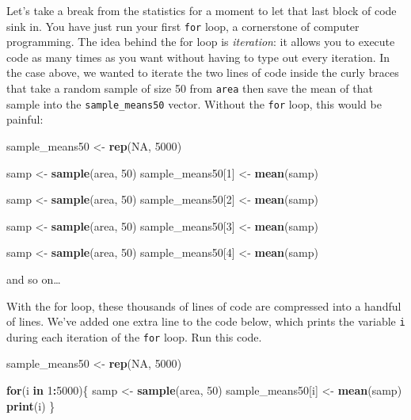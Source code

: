 \documentclass[]{book}
\newenvironment{Shaded}{\begin{snugshade}}{\end{snugshade}}
\newcommand{\ControlFlowTok}[1]{\textcolor[rgb]{0.13,0.29,0.53}{\textbf{#1}}}
\newcommand{\DecValTok}[1]{\textcolor[rgb]{0.00,0.00,0.81}{#1}}
\newcommand{\KeywordTok}[1]{\textcolor[rgb]{0.13,0.29,0.53}{\textbf{#1}}}
\newcommand{\NormalTok}[1]{#1}
\newcommand{\OperatorTok}[1]{\textcolor[rgb]{0.81,0.36,0.00}{\textbf{#1}}}
\newcommand{\OtherTok}[1]{\textcolor[rgb]{0.56,0.35,0.01}{#1}}
\newcommand{\StringTok}[1]{\textcolor[rgb]{0.31,0.60,0.02}{#1}}
\theoremstyle{definition}
\theoremstyle{definition}
\theoremstyle{definition}
\theoremstyle{remark}
\begin{document}
Let's take a break from the statistics for a moment to let that last
block of code sink in. You have just run your first \texttt{for} loop, a
cornerstone of computer programming. The idea behind the for loop is
\emph{iteration}: it allows you to execute code as many times as you
want without having to type out every iteration. In the case above, we
wanted to iterate the two lines of code inside the curly braces that
take a random sample of size 50 from \texttt{area} then save the mean of
that sample into the \texttt{sample\_means50} vector. Without the
\texttt{for} loop, this would be painful:

\begin{Shaded}
\begin{Highlighting}[]
\NormalTok{sample_means50 <-}\StringTok{ }\KeywordTok{rep}\NormalTok{(}\OtherTok{NA}\NormalTok{, }\DecValTok{5000}\NormalTok{)}

\NormalTok{samp <-}\StringTok{ }\KeywordTok{sample}\NormalTok{(area, }\DecValTok{50}\NormalTok{)}
\NormalTok{sample_means50[}\DecValTok{1}\NormalTok{] <-}\StringTok{ }\KeywordTok{mean}\NormalTok{(samp)}

\NormalTok{samp <-}\StringTok{ }\KeywordTok{sample}\NormalTok{(area, }\DecValTok{50}\NormalTok{)}
\NormalTok{sample_means50[}\DecValTok{2}\NormalTok{] <-}\StringTok{ }\KeywordTok{mean}\NormalTok{(samp)}

\NormalTok{samp <-}\StringTok{ }\KeywordTok{sample}\NormalTok{(area, }\DecValTok{50}\NormalTok{)}
\NormalTok{sample_means50[}\DecValTok{3}\NormalTok{] <-}\StringTok{ }\KeywordTok{mean}\NormalTok{(samp)}

\NormalTok{samp <-}\StringTok{ }\KeywordTok{sample}\NormalTok{(area, }\DecValTok{50}\NormalTok{)}
\NormalTok{sample_means50[}\DecValTok{4}\NormalTok{] <-}\StringTok{ }\KeywordTok{mean}\NormalTok{(samp)}
\end{Highlighting}
\end{Shaded}

and so on\ldots{}

With the for loop, these thousands of lines of code are compressed into
a handful of lines. We've added one extra line to the code below, which
prints the variable \texttt{i} during each iteration of the \texttt{for}
loop. Run this code.

\begin{Shaded}
\begin{Highlighting}[]
\NormalTok{sample_means50 <-}\StringTok{ }\KeywordTok{rep}\NormalTok{(}\OtherTok{NA}\NormalTok{, }\DecValTok{5000}\NormalTok{)}

\ControlFlowTok{for}\NormalTok{(i }\ControlFlowTok{in} \DecValTok{1}\OperatorTok{:}\DecValTok{5000}\NormalTok{)\{}
\NormalTok{   samp <-}\StringTok{ }\KeywordTok{sample}\NormalTok{(area, }\DecValTok{50}\NormalTok{)}
\NormalTok{   sample_means50[i] <-}\StringTok{ }\KeywordTok{mean}\NormalTok{(samp)}
   \KeywordTok{print}\NormalTok{(i)}
\NormalTok{   \}}
\end{Highlighting}
\end{Shaded}
\end{document}

